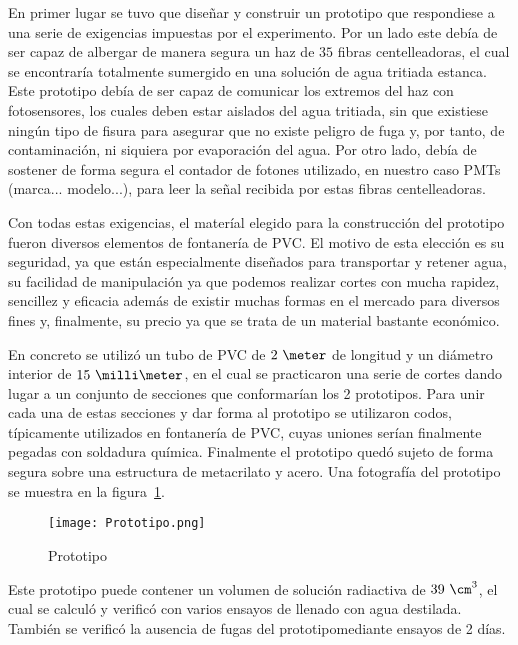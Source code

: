 En primer lugar se tuvo que diseñar y construir un prototipo que respondiese a una serie de exigencias impuestas por el experimento. Por un lado este debía de ser capaz de albergar de manera segura  un haz de $35$ fibras centelleadoras, el cual se encontraría totalmente sumergido en una solución de agua tritiada estanca. Este prototipo debía de ser capaz de comunicar los extremos del haz con fotosensores, los cuales deben estar aislados del agua tritiada, sin que existiese ningún tipo de fisura para asegurar que no existe peligro de fuga y, por tanto, de contaminación, ni siquiera por evaporación del agua. Por otro lado, debía de sostener de forma segura el contador de fotones utilizado, en nuestro caso PMTs (marca... modelo...), para leer la señal recibida por estas fibras centelleadoras.

Con todas estas exigencias, el materíal elegido para la construcción del prototipo fueron diversos elementos de fontanería de PVC. El motivo de esta elección es su seguridad, ya que están especialmente diseñados para transportar y retener agua, su facilidad de manipulación ya que podemos realizar cortes con mucha rapidez, sencillez y eficacia además de existir muchas formas  en el mercado para diversos fines y, finalmente, su precio ya que se trata de un material bastante económico. 

En concreto se utilizó un tubo de PVC de $2~\meter$ de longitud y un diámetro interior de $15~\milli\meter$, en el cual se practicaron una serie de cortes dando lugar a un conjunto de secciones que conformarían los 2 prototipos. Para unir cada una de estas secciones y dar forma al prototipo se utilizaron codos, típicamente utilizados en fontanería de PVC, cuyas uniones serían finalmente pegadas con soldadura química. Finalmente el prototipo quedó sujeto de forma segura sobre una estructura de metacrilato y acero. Una fotografía del prototipo se muestra en la figura~\ref{prototipo}.

\begin{figure}[hbtp]
\centering
\texttt{[image: Prototipo.png]}
\caption{ Prototipo\label{prototipo}}
\end{figure}

Este prototipo puede contener un volumen de solución radiactiva de $39~\cm^3$, el cual se calculó y verificó con varios ensayos de llenado con agua destilada. También se verificó la ausencia de fugas del prototipomediante ensayos de 2 días. 

